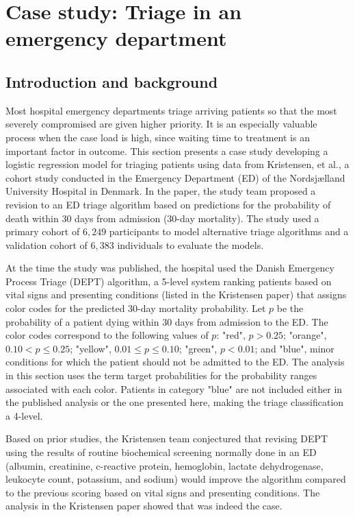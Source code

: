 \section{Case study: Triage in an emergency department}
\label{caseStudy}

\subsection{Introduction and background}
\label{section:IntroDanishED}

Most hospital emergency departments triage arriving patients so that the most severely compromised  are given higher priority. It is an especially valuable process when the case load is high, since waiting time to treatment is an important factor in outcome.  This section presents a case study developing a logistic regression model for triaging patients using data from Kristensen, et al., a cohort study conducted in the Emergency Department (ED) of the Nordsj{\ae}lland University Hospital in Denmark.  In the paper, the study team proposed a revision to an ED triage algorithm based on predictions for the probability of death within 30 days from admission (30-day mortality).  The study used a primary cohort of $6,249$ participants to model alternative triage algorithms and a validation cohort of $6,383$ individuals to evaluate the models.   

At the time the study was published, the hospital used the Danish Emergency Process Triage (DEPT) algorithm, a 5-level system ranking patients based on vital signs and presenting conditions (listed in the Kristensen paper) that assigns color codes for the predicted 30-day mortality probability.  Let $p$ be the probability of a patient dying within 30 days from admission to the ED\@.  The color codes correspond to the following values of $p$: "red", $p > 0.25$; "orange", $0.10 < p \leq 0.25$; "yellow",  $0.01 \leq  p  \leq 0.10$; "green",  $p < 0.01$; and "blue", minor conditions for which the patient should not be admitted to the ED\@. The analysis in this section uses the term target probabilities for the probability ranges associated with each color. Patients in category "blue" are not included either in the published analysis or the one presented here, making the triage classification a 4-level.

Based on prior studies, the Kristensen team conjectured that revising DEPT using  the results of routine biochemical screening normally done in an ED (albumin, creatinine, c-reactive protein, hemoglobin, lactate dehydrogenase, leukocyte count, potassium, and sodium) would improve the algorithm compared to the previous scoring based on vital signs and presenting conditions.  The analysis in the Kristensen paper showed that was indeed the case.

